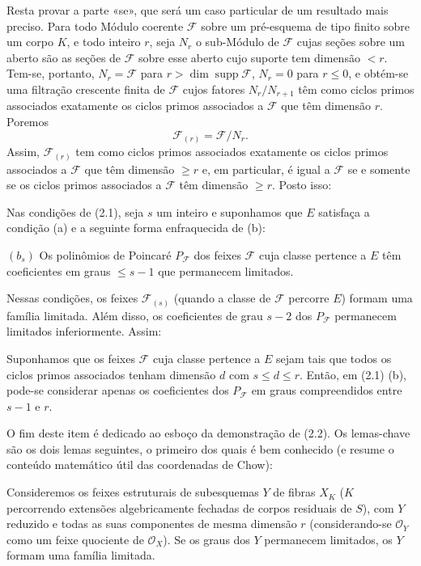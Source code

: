 Resta provar a parte «se», que será um caso particular de um resultado mais
preciso. Para todo Módulo coerente $\mathcal F$ sobre um pré-esquema de tipo
finito sobre um corpo $K$, e todo inteiro $r$, seja $N_r$ o sub-Módulo de
$\mathcal F$ cujas seções sobre um aberto são as seções de $\mathcal F$ sobre
esse aberto cujo suporte tem dimensão $<r$. Tem-se, portanto,
$N_r=\mathcal F$ para $r>\dim\operatorname{supp}\mathcal F$, $N_r=0$ para
$r\leq0$, e obtém-se uma filtração crescente finita de $\mathcal F$ cujos
fatores $N_r/N_{r+1}$ têm como ciclos primos associados exatamente os ciclos primos
associados a $\mathcal F$ que têm dimensão $r$. Poremos
\[
\mathcal F_{(r)}=\mathcal F/N_r.
\]
Assim, $\mathcal F_{(r)}$ tem como ciclos primos associados exatamente os
ciclos primos associados a $\mathcal F$ que têm dimensão $\geq r$ e, em
particular, é igual a $\mathcal F$ se e somente se os ciclos primos associados
a $\mathcal F$ têm dimensão $\geq r$. Posto isso:

 Nas condições de (2.1), seja $s$ um inteiro e suponhamos
que $E$ satisfaça a condição (a) e a seguinte forma enfraquecida de (b):

\medskip
\noindent $(b_s)$ Os polinômios de Poincaré $P_{\mathcal F}$ dos feixes
$\mathcal F$ cuja classe pertence a $E$ têm coeficientes em graus
$\leq s-1$ que permanecem limitados.

Nessas condições, os feixes $\mathcal F_{(s)}$ (quando a classe de
$\mathcal F$ percorre $E$) formam uma família limitada. Além disso, os
coeficientes de grau $s-2$ dos $P_{\mathcal F}$ permanecem limitados
inferiormente.
Assim:

 Suponhamos que os feixes $\mathcal F$ cuja classe
pertence a $E$ sejam tais que todos os ciclos primos associados tenham dimensão
$d$ com $s\leq d\leq r$. Então, em (2.1) (b), pode-se considerar apenas os
coeficientes dos $P_{\mathcal F}$ em graus compreendidos entre $s-1$ e $r$.

O fim deste item é dedicado ao esboço da demonstração de (2.2). Os lemas-chave
são os dois lemas seguintes, o primeiro dos quais é bem conhecido (e resume o
conteúdo matemático útil das coordenadas de Chow):

 Consideremos os feixes estruturais de subesquemas
$Y$ de fibras $X_K$ ($K$ percorrendo extensões algebricamente fechadas de
corpos residuais de $S$), com $Y$ reduzido e todas as suas componentes de mesma
dimensão $r$ (considerando-se $\mathcal O_Y$ como um feixe quociente de
$\mathcal O_X$). Se os graus dos $Y$ permanecem limitados, os $Y$ formam uma
família limitada.

